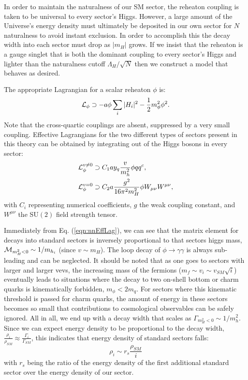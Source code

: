 \documentclass[nofootinbib,twocolumn,preprintnumbers]{revtex4-1}
\begin{document}
In order to maintain the naturalness of our SM sector, the reheaton coupling is taken to be universal to every sector's Higgs. However, a large amount of the Universe's energy density must ultimately be deposited in our own sector for $N$naturalness to avoid instant exclusion. In order to accomplish this the decay width into each sector must drop as $\vert m_H\vert$ grows. If we insist that the reheaton is a gauge singlet that is both the dominant coupling to every sector's Higgs and lighter than the naturalness cutoff $\Lambda_H/\sqrt{N}$ then we construct a model that behaves as desired. 

The appropriate Lagrangian for a scalar reheaton $\phi$ is: 
\begin{equation}\label{eqn:nnLagrangian}
{\cal L}_\phi \supset -a\phi\sum_i\vert H_i\vert^2 - \frac{1}{2}m^2_\phi \phi^2.
\end{equation}
 Note that the cross-quartic couplings are absent, suppressed by a very small coupling. Effective Lagrangians for the two different types of sectors present in this theory can be obtained by integrating out of the Higgs bosons in every sector:
\begin{equation}\label{eqn:nnEffLag}
\begin{split}
{\cal L}_\phi^{v \neq 0} &\supset C_1 a y_q\frac{v}{m_h^2}\phi q q^c,
\\
{\cal L}_\phi^{v = 0} &\supset C_2 a \frac{g^2}{16\pi^2 m_H^2}\phi W_{\mu\nu}W^{\mu\nu},
\end{split}
\end{equation}
with $C_i$ representing numerical coefficients, $g$ the weak coupling constant, and $W^{\mu\nu}$ the SU$(2)$ field strength tensor.

Immediately from Eq. (\ref{eqn:nnEffLag}), we can see that the matrix element for decays into standard sectors is inversely proportional to that sectors higgs mass, ${\cal M}_{m_H^2 < 0} \sim 1/m_{h_i}$ (since $v\sim m_H$). 
The loop decay of $\phi \rightarrow \gamma\gamma$ is always sub-leading and can be neglected. It should be noted that as one goes to sectors with larger and larger vevs, the increasing mass of the fermions ($m_f \sim v_i \sim v_{SM}\sqrt{i}$) eventually leads to situations where the decay to two on-shell bottom or charm quarks is kinematically forbidden, $m_\phi < 2 m_q$. For sectors where this kinematic threshold is passed for charm quarks, the amount of energy in these sectors becomes so small that contributions to cosmological observables can be safely ignored. All in all, we end up with a decay width that scales as $\Gamma_{m_H^2<0} \sim 1/m_h^2$. Since we can expect energy density to be proportional to the decay width, $\frac{\rho_i}{\rho_{SM}} \approx \frac{\Gamma_i}{\Gamma_{SM}}$, this indicates that energy density of standard sectors falls:
\begin{equation}\label{eqn:edSS}
\rho_i \sim r_{s}\frac{\rho_{SM}}{i}
\end{equation} 
with $r_s$ being the ratio of the energy density of the first additional standard sector over the energy density of our sector.
\end{document}
